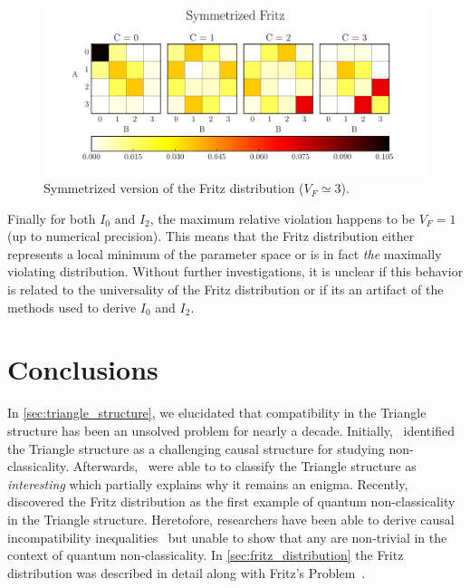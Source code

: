 \documentclass[aps, 10pt, english, twoside, pra, nofootinbib, tightenlines, longbibliography, superscriptaddress]{revtex4-1}
\begin{document}
    \begin{figure}
    \begin{center}
            \includegraphics[scale=0.6,trim={0 0 0 0.4in},clip]{../../figures/distributions/symmetrized_fritz.pdf}
            \caption{Symmetrized version of the Fritz distribution ($V_F \simeq 3$).}
            \label{fig:symmetrized_fritz}
    \end{center}
    \end{figure}

    Finally for both $I_0$ and $I_2$, the maximum relative violation happens to be $V_F = 1$ (up to numerical precision). This means that the Fritz distribution either represents a local minimum of the parameter space or is in fact \textit{the} maximally violating distribution. Without further investigations, it is unclear if this behavior is related to the universality of the Fritz distribution or if its an artifact of the methods used to derive $I_0$ and $I_2$.

    \section{Conclusions}
    \label{sec:conclusions}
    In \cref{sec:triangle_structure}, we elucidated that compatibility in the Triangle structure has been an unsolved problem for nearly a decade. Initially,~\citet{Branciard_2012} identified the Triangle structure as a challenging causal structure for studying non-classicality. Afterwards,~\citet{Henson_2014} were able to to classify the Triangle structure as \textit{interesting} which partially explains why it remains an enigma. Recently,~\citet{Fritz_2012} discovered the Fritz distribution as the first example of quantum non-classicality in the Triangle structure. Heretofore, researchers have been able to derive causal incompatibility inequalities~\cite{Inflation,Steudel_2010,Henson_2014} but unable to show that any are non-trivial in the context of quantum non-classicality. In \cref{sec:fritz_distribution} the Fritz distribution was described in detail along with Fritz's Problem~\cite[Problem 2.17]{Fritz_2012}.
\end{document}
